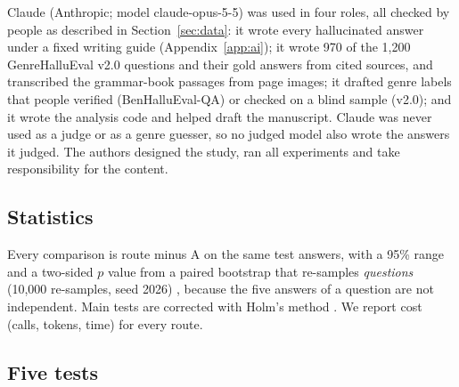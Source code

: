 \documentclass[11pt]{article}
\begin{document}
Claude (Anthropic; model claude-opus-5-5) was used in four roles, all checked by people as described in
Section~\ref{sec:data}: it wrote every hallucinated answer under a fixed writing guide (Appendix~\ref{app:ai}); it wrote
970 of the 1,200 GenreHalluEval v2.0 questions and their gold answers from cited sources, and transcribed the
grammar-book passages from page images; it drafted genre labels that people verified (BenHalluEval-QA) or checked on a
blind sample (v2.0); and it wrote the analysis code and helped draft the manuscript. Claude was never used as a judge or
as a genre guesser, so no judged model also wrote the answers it judged. The authors designed the study, ran all
experiments and take responsibility for the content.

\subsection{Statistics}

Every comparison is route minus A on the same test answers, with a 95\% range and a two-sided $p$ value from a paired
bootstrap that re-samples \emph{questions} (10,000 re-samples, seed 2026) \citep{efron1979}, because the five answers
of a question are not independent. Main tests are corrected with Holm's method \citep{holm1979}. We report cost
(calls, tokens, time) for every route.

\subsection{Five tests}
\end{document}
